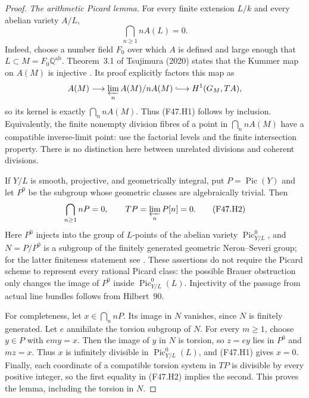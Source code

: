 \begin{proof}
\emph{The arithmetic Picard lemma.}
For every finite extension $L/k$ and every abelian variety $A/L$,
\[
                 \bigcap_{n\geq1}nA(L)=0.                 \tag{F47.H1}
\]
Indeed, choose a number field $F_0$ over which $A$ is defined and large
enough that $L\subset M=F_0\mathbb Q^{\mathrm{ab}}$. Theorem~3.1 of
Tsujimura (2020) states that the Kummer map on $A(M)$ is injective
\citep{Tsujimura2020}. Its proof explicitly factors this map as
\[
 A(M)\longrightarrow\varprojlim_n A(M)/nA(M)
       \lhook\joinrel\longrightarrow H^1(G_M,T A),
\]
so its kernel is exactly $\bigcap_n nA(M)$. Thus (F47.H1) follows by
inclusion. Equivalently, the finite nonempty division fibres of a point
in $\bigcap_n nA(M)$ have a compatible inverse-limit point: use the
factorial levels and the finite intersection property. There is no
distinction here between unrelated divisions and coherent divisions.

If $Y/L$ is smooth, projective, and geometrically integral, put
$P=\operatorname{Pic}(Y)$ and let $P^0$ be the subgroup whose geometric
classes are algebraically trivial. Then
\[
                 \bigcap_{n\geq1}nP=0,
                 \qquad T P=\varprojlim_n P[n]=0.         \tag{F47.H2}
\]
Here $P^0$ injects into the group of $L$-points of the abelian variety
$\operatorname{Pic}^0_{Y/L}$, and
$N=P/P^0$ is a subgroup of the finitely generated geometric
Neron--Severi group; for the latter finiteness statement see
\cite[Theorem~7.3 and Lemma~7.2]{FA_ChengEtAl2021}.
These assertions do not require the Picard scheme
to represent every rational Picard class: the possible Brauer
obstruction only changes the image of $P^0$ inside
$\operatorname{Pic}^0_{Y/L}(L)$. Injectivity of the passage from actual
line bundles follows from Hilbert~90.

For completeness, let $x\in\bigcap_n nP$. Its image in $N$ vanishes,
since $N$ is finitely generated. Let $e$ annihilate the torsion subgroup
of $N$. For every $m\geq1$, choose $y\in P$ with $em y=x$.
Then the image of $y$ in $N$ is torsion, so $z=ey$ lies in $P^0$ and
$mz=x$. Thus $x$ is infinitely divisible in
$\operatorname{Pic}^0_{Y/L}(L)$, and (F47.H1) gives $x=0$. Finally, each
coordinate of a compatible torsion system in $T P$ is divisible by
every positive integer, so the first equality in (F47.H2) implies the
second. This proves the lemma, including the torsion in $N$.


\end{proof}
